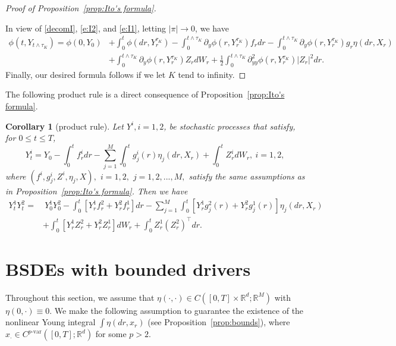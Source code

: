 \documentclass[11pt,reqno]{amsart}
\def\R{\mathbb R}
\newtheorem{corollary}{Corollary}[section]
\numberwithin{equation}{section}
\begin{document}
\begin{proof}[Proof of Proposition~\ref{prop:Ito's formula}]
\ \ \ \ \

In view of \eqref{decomI}, \eqref{e:I2}, and \eqref{e:I1}, letting $|\pi|\rightarrow 0$, we have
\begin{equation*}
\begin{aligned}
\phi(t,Y_{t\land \tau_{K}}) =   \phi(0,Y_{0}) &+ \int_{0}^{t}  \phi(dr,Y^{\tau_{K}}_{r}) -\int_{0}^{t\land\tau_{K}}\partial_{y}  \phi(r,Y^{\tau_{K}}_{r}) f_{r} dr - \int_{0}^{t\land\tau_{K}} \partial_{y}  \phi(r,Y^{\tau_{K}}_{r})g_{r}\eta(dr,X_{r})\\
&+ \int_{0}^{t\land\tau_{K}}  \partial_{y} \phi(r,Y^{\tau_{K}}_{r})Z_{r} dW_{r} + \frac{1}{2}\int_{0}^{t\land\tau_{K}}\partial^{2}_{yy}  \phi(r,Y^{\tau_{K}}_{r})|Z_{r}|^{2} dr.
\end{aligned}
\end{equation*}
Finally, our desired formula follows if we let $K$ tend to infinity. 
\end{proof}

The following product rule is a direct consequence of Proposition~\ref{prop:Ito's formula}. 
\begin{corollary}[product rule] \label{cor:product rule}
Let $Y^{i},i=1,2$, be stochastic processes that satisfy, for $0\le t\le T$,
\[Y^{i}_{t} = Y_{0} - \int_{0}^{t}f^{i}_{r}dr - \sum_{j=1}^{M}\int_{0}^{t}g^{i}_{j}(r)\eta_{j}(dr,X_{r}) + \int_{0}^{t}Z^{i}_{r}dW_{r},\ i=1,2,\]
where $(f^i,g^{i}_{j},Z^i,\eta_{j},X),$ $i=1,2,$ $j=1,2,...,M,$ satisfy the same assumptions as in Proposition~\ref{prop:Ito's formula}. Then we have
\begin{equation*}
\begin{split}
Y^{1}_{t}Y^{2}_{t}  = & \  Y^{1}_{0}Y^{2}_{0}  - \int_{0}^{t}\left[Y^{1}_{r}f^{2}_{r} + Y^{2}_{r}f^{1}_{r}\right]dr - \sum_{j=1}^{M}\int_{0}^{t}\left[Y^{1}_{r}g^{2}_{j}(r) + Y^{2}_{r}g^{1}_{j}(r)\right] \eta_{j}(dr,X_{r})  \\
&+ \int_{0}^{t} \left[Y^{1}_{r}Z^{2}_{r} + Y^{2}_{r}Z^{1}_{r}\right]dW_{r}  + \int_{0}^{t}Z^{1}_{r}(Z^{2}_{r})^{\top}dr.
\end{split}
\end{equation*}
\end{corollary}




\section{BSDEs with bounded drivers}\label{sec:BSDE with bounded drift}

Throughout this section, we assume that $\eta(\cdot, \cdot)\in C([0,T]\times\mathbb{R}^{d};\mathbb{R}^{M})$ with $\eta(0,\cdot)\equiv 0$. We make the following assumption to guarantee the existence of the nonlinear Young integral $\int \eta(dr, x_r)$ (see Proposition~\ref{prop:bounds}), where $x_{\cdot}\in C^{p\text{-var}}([0,T];\R^d)$ for some $p>2$.
\end{document}
